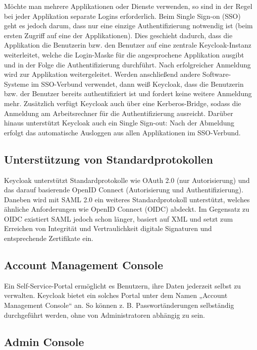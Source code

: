 Möchte man mehrere Applikationen oder Dienste verwenden, so sind in der Regel bei jeder Applikation separate Logins erforderlich. Beim Single Sign-on (SSO) geht es jedoch darum, 
dass nur eine einzige Authentifizierung notwendig ist (beim ersten Zugriff auf eine der Applikationen). Dies geschieht dadurch, dass die Applikation die Benutzerin bzw. 
den Benutzer auf eine zentrale Keycloak-Instanz weiterleitet, welche die Login-Maske für die angesprochene Applikation ausgibt und in der Folge die Authentifizierung durchführt.
Nach erfolgreicher Anmeldung wird zur Applikation weitergeleitet. Werden anschließend andere Software-Systeme im SSO-Verbund verwendet, dann weiß Keycloak, dass die Benutzerin bzw. 
der Benutzer bereits authentifiziert ist und fordert keine weitere Anmeldung mehr. Zusätzlich verfügt Keycloak auch über eine Kerberos-Bridge, sodass die Anmeldung am Arbeitsrechner 
für die Authentifizierung ausreicht. Darüber hinaus unterstützt Keycloak auch ein Single Sign-out: Nach der Abmeldung erfolgt das automatische Ausloggen aus allen Applikationen im SSO-Verbund.
\cite{sysarch-keycloak-2}

\subsection{Unterstützung von Standardprotokollen}

Keycloak unterstützt Standardprotokolle wie OAuth 2.0 (nur Autorisierung) und das darauf basierende OpenID Connect (Autorisierung und Authentifizierung). 
Daneben wird mit SAML 2.0 ein weiteres Standardprotokoll unterstützt, welches ähnliche Anforderungen wie OpenID Connect (OIDC) abdeckt. 
Im Gegensatz zu OIDC existiert SAML jedoch schon länger, basiert auf XML und setzt zum Erreichen von Integrität und Vertraulichkeit digitale Signaturen und entsprechende Zertifikate ein.
\cite{sysarch-keycloak-2}

\subsection{Account Management Console}

Ein Self-Service-Portal ermöglicht es Benutzern, ihre Daten jederzeit selbst zu verwalten. Keycloak bietet ein solches Portal unter dem Namen „Account Management Console“ an. 
So können z. B. Passwortänderungen selbständig durchgeführt werden, ohne von Administratoren abhängig zu sein.
\cite{sysarch-keycloak-2}

\subsection{Admin Console}

